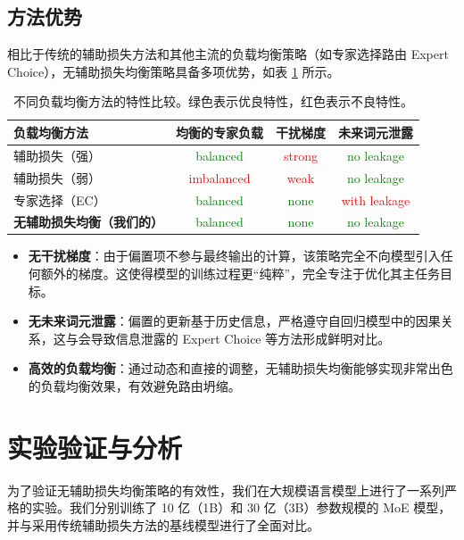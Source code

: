 \subsection{方法优势}
\label{sec:theoretical_advantages}
相比于传统的辅助损失方法和其他主流的负载均衡策略（如专家选择路由 Expert Choice），无辅助损失均衡策略具备多项优势，如表 \ref{tab:method_comparison} 所示。

\begin{table}[htbp]
    \centering
    \caption{不同负载均衡方法的特性比较。绿色表示优良特性，红色表示不良特性。}
    \begin{tabular}{l|ccc}
        \toprule
        \textbf{负载均衡方法} & \textbf{均衡的专家负载} & \textbf{干扰梯度} & \textbf{未来词元泄露} \\
        \midrule
        辅助损失（强） & \textcolor{green}{balanced} & \textcolor{red}{strong} & \textcolor{green}{no leakage} \\
        辅助损失（弱） & \textcolor{red}{imbalanced} & \textcolor{red}{weak} & \textcolor{green}{no leakage} \\
        专家选择（EC） & \textcolor{green}{balanced} & \textcolor{green}{none} & \textcolor{red}{with leakage} \\
        \textbf{无辅助损失均衡（我们的）} & \textcolor{green}{balanced} & \textcolor{green}{none} & \textcolor{green}{no leakage} \\
        \bottomrule
    \end{tabular}
    \label{tab:method_comparison}
\end{table}

\begin{itemize}
    \item \textbf{无干扰梯度}：由于偏置项不参与最终输出的计算，该策略完全不向模型引入任何额外的梯度。这使得模型的训练过程更“纯粹”，完全专注于优化其主任务目标。
    \item \textbf{无未来词元泄露}：偏置的更新基于历史信息，严格遵守自回归模型中的因果关系，这与会导致信息泄露的 Expert Choice 等方法形成鲜明对比。
    \item \textbf{高效的负载均衡}：通过动态和直接的调整，无辅助损失均衡能够实现非常出色的负载均衡效果，有效避免路由坍缩。
\end{itemize}

\section{实验验证与分析}
\label{sec:experiments_analysis}
为了验证无辅助损失均衡策略的有效性，我们在大规模语言模型上进行了一系列严格的实验。我们分别训练了 10 亿（1B）和 30 亿（3B）参数规模的 MoE 模型，并与采用传统辅助损失方法的基线模型进行了全面对比。

